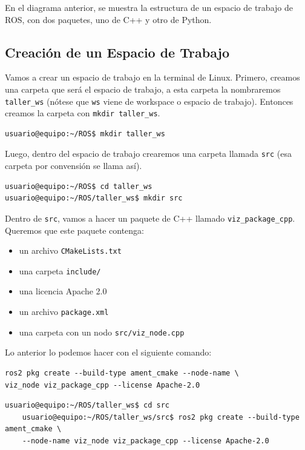 \vspace{1.5em}

En el diagrama anterior, se muestra la estructura de un espacio de trabajo de ROS, con dos paquetes, uno de C++ y otro de Python.

\subsection{Creación de un Espacio de Trabajo}
Vamos a crear un espacio de trabajo en la terminal de Linux. Primero, creamos una carpeta que será el espacio de trabajo, a esta carpeta la nombraremos \texttt{taller\_ws} (nótese que \texttt{ws} viene de workspace o espacio de trabajo). Entonces creamos la carpeta con \texttt{mkdir taller\_ws}. 

\begin{verbatim}
usuario@equipo:~/ROS$ mkdir taller_ws
\end{verbatim}

Luego, dentro del espacio de trabajo crearemos una carpeta llamada \texttt{src} (esa carpeta por convensión se llama así).

\begin{verbatim}
usuario@equipo:~/ROS$ cd taller_ws
usuario@equipo:~/ROS/taller_ws$ mkdir src
\end{verbatim}

Dentro de \texttt{src}, vamos a hacer un paquete de C++ llamado \texttt{viz\_package\_cpp}. Queremos que este paquete contenga:

\begin{itemize}
    \item un archivo \texttt{CMakeLists.txt}
    \item una carpeta \texttt{include/}
    \item una licencia Apache 2.0
    \item un archivo \texttt{package.xml}
    \item una carpeta con un nodo \texttt{src/viz\_node.cpp} 
\end{itemize}

Lo anterior lo podemos hacer con el siguiente comando:

\begin{verbatim}
ros2 pkg create --build-type ament_cmake --node-name \
viz_node viz_package_cpp --license Apache-2.0
\end{verbatim}

\begin{center}
  \begin{Verbatim}[gobble=4]
    usuario@equipo:~/ROS/taller_ws$ cd src
    usuario@equipo:~/ROS/taller_ws/src$ ros2 pkg create --build-type ament_cmake \
    --node-name viz_node viz_package_cpp --license Apache-2.0
  \end{Verbatim}
\end{center}

